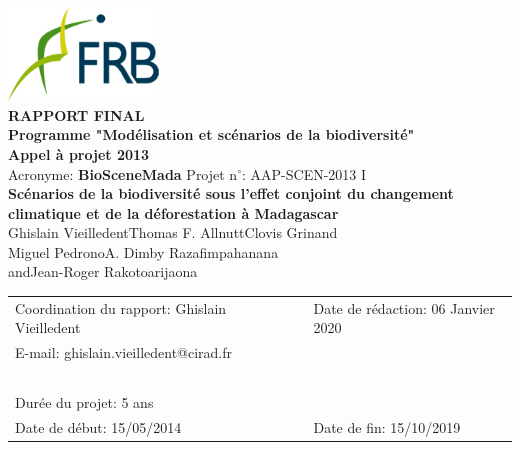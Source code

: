 \renewcommand{\bibsection}{}
\begin{center}
\includegraphics[width=4cm]{figures/FRB.png}\\
\vspace{1cm}
{\large
  \textbf{
    RAPPORT FINAL\\
    Programme "Modélisation et scénarios de la biodiversité"\\
    Appel à projet 2013\\
  }
}
\vspace{1cm}
Acronyme: \textbf{BioSceneMada} \hspace{2cm} Projet n$^{\circ}$: AAP-SCEN-2013 I\\
\vspace{1cm}
{\Large \textbf{Scénarios de la biodiversité sous l'effet conjoint du changement climatique et de la déforestation à Madagascar}}\\
\vspace{1cm}
{\large 
  Ghislain Vieilledent\hspace{1cm}Thomas F. Allnutt\hspace{1cm}Clovis Grinand\\
  \vspace{0.25cm}
  Miguel Pedrono\hspace{1cm}A. Dimby Razafimpahanana\\
  \vspace{0.25cm}
  and\hspace{1cm}Jean-Roger Rakotoarijaona\\
}
\vspace{1cm}
\begin{tabular}{lcl}
Coordination du rapport: Ghislain Vieilledent & \hspace{1cm} & Date de rédaction: 06 Janvier 2020\\
E-mail: ghislain.vieilledent@cirad.fr & \hspace{1cm} & ~ \\ 
~ & ~ \\
Durée du projet: 5 ans & \hspace{1cm} & ~ \\  
Date de début: 15/05/2014 & \hspace{1cm} & Date de fin: 15/10/2019\\
\end{tabular}
\end{center}
\newpage